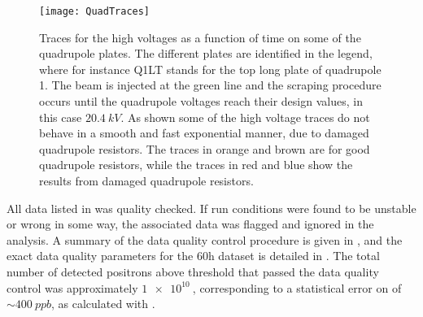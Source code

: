 \begin{figure}
    \centering
    \texttt{[image: QuadTraces]}
    \caption[Electrostatic quadrupole high voltage traces]{Traces for the high voltages as a function of time on some of the quadrupole plates. The different plates are identified in the legend, where for instance Q1LT stands for the top long plate of quadrupole 1. The beam is injected at the green line and the scraping procedure occurs until the quadrupole voltages reach their design values, in this case $\SI{20.4}{kV}$. As shown some of the high voltage traces do not behave in a smooth and fast exponential manner, due to damaged quadrupole resistors. The traces in orange and brown are for good quadrupole resistors, while the traces in red and blue show the results from damaged quadrupole resistors.}
    \label{fig:QuadTraces}
\end{figure}


All data listed in  was quality checked. If run conditions were found to be unstable or wrong in some way, the associated data was flagged and ignored in the analysis. A summary of the data quality control procedure is given in , and the exact data quality parameters for the 60h dataset is detailed in . The total number of detected positrons above threshold that passed the data quality control was approximately $\SI{1e10}{}$, corresponding to a statistical error on \wa of $\sim\SI{400}{ppb}$, as calculated with .




